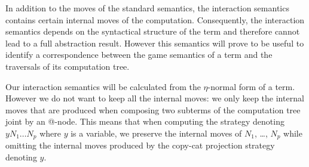 In addition to the moves of the standard semantics, the interaction semantics contains certain
internal moves of the computation.
Consequently, the interaction semantics depends on the syntactical structure of the term and therefore cannot
lead to a full abstraction result. However this semantics will prove to be useful to identify
a correspondence between the game semantics
of a term and the traversals of its computation tree.

Our interaction semantics will be calculated from the
$\eta$-normal form of a term. However we do not want to keep all the internal moves: we only keep the internal
moves that are produced when composing two subterms of the computation tree joint by an @-node.
This means that when computing the strategy denoting
$y N_1 \ldots N_p$ where $y$ is a variable, we preserve the internal moves of $N_1$, \ldots, $N_p$ while
omitting the internal moves produced by the copy-cat projection strategy denoting $y$.

